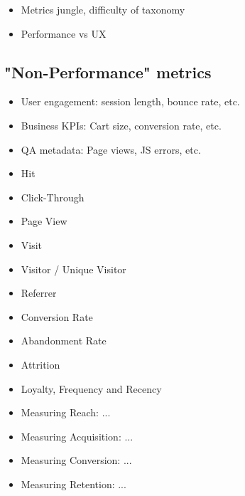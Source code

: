 \begin{itemize}
\item Metrics jungle, difficulty of taxonomy
\item Performance vs UX
\end{itemize}










\subsection{"Non-Performance" metrics}

\begin{itemize}
\item User engagement: session length, bounce rate, etc.
\item Business KPIs: Cart size, conversion rate, etc.
\item QA metadata: Page views, JS errors, etc.
\end{itemize}



\begin{itemize}
\item Hit
\item Click-Through
\item Page View
\item Visit
\item Visitor / Unique Visitor
\item Referrer
\item Conversion Rate
\item Abandonment Rate
\item Attrition
\item Loyalty, Frequency and Recency
\item Measuring Reach: ...
\item Measuring Acquisition: ...
\item Measuring Conversion: ...
\item Measuring Retention: ...
\end{itemize}


